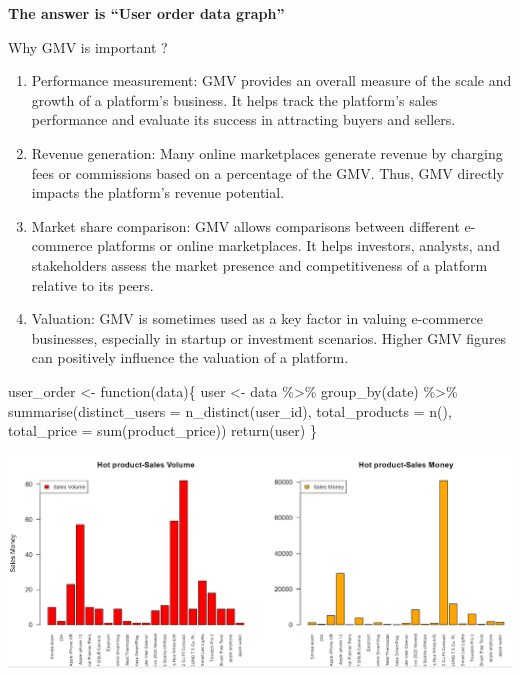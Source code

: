 \documentclass[
  11pt,
]{article}
\newenvironment{Shaded}{\begin{snugshade}}{\end{snugshade}}
\newcommand{\AttributeTok}[1]{\textcolor[rgb]{0.40,0.45,0.13}{#1}}
\newcommand{\ControlFlowTok}[1]{\textcolor[rgb]{0.00,0.23,0.31}{#1}}
\newcommand{\FunctionTok}[1]{\textcolor[rgb]{0.28,0.35,0.67}{#1}}
\newcommand{\NormalTok}[1]{\textcolor[rgb]{0.00,0.23,0.31}{#1}}
\newcommand{\OtherTok}[1]{\textcolor[rgb]{0.00,0.23,0.31}{#1}}
\newcommand{\SpecialCharTok}[1]{\textcolor[rgb]{0.37,0.37,0.37}{#1}}
\begin{document}
\textbf{The answer is ``User order data graph''}

Why GMV is important ?

\begin{enumerate}
\def\labelenumi{\arabic{enumi}.}
\item
  Performance measurement: GMV provides an overall measure of the scale
  and growth of a platform's business. It helps track the platform's
  sales performance and evaluate its success in attracting buyers and
  sellers.
\item
  Revenue generation: Many online marketplaces generate revenue by
  charging fees or commissions based on a percentage of the GMV. Thus,
  GMV directly impacts the platform's revenue potential.
\item
  Market share comparison: GMV allows comparisons between different
  e-commerce platforms or online marketplaces. It helps investors,
  analysts, and stakeholders assess the market presence and
  competitiveness of a platform relative to its peers.
\item
  Valuation: GMV is sometimes used as a key factor in valuing e-commerce
  businesses, especially in startup or investment scenarios. Higher GMV
  figures can positively influence the valuation of a platform.
\end{enumerate}

\begin{Shaded}
\begin{Highlighting}[]
\NormalTok{user\_order }\OtherTok{\textless{}{-}} \ControlFlowTok{function}\NormalTok{(data)\{}
\NormalTok{  user }\OtherTok{\textless{}{-}}\NormalTok{  data }\SpecialCharTok{\%\textgreater{}\%}
    \FunctionTok{group\_by}\NormalTok{(date) }\SpecialCharTok{\%\textgreater{}\%}
    \FunctionTok{summarise}\NormalTok{(}\AttributeTok{distinct\_users =} \FunctionTok{n\_distinct}\NormalTok{(user\_id),}
              \AttributeTok{total\_products =} \FunctionTok{n}\NormalTok{(),}
              \AttributeTok{total\_price =} \FunctionTok{sum}\NormalTok{(product\_price))}
  \FunctionTok{return}\NormalTok{(user)}
\NormalTok{\}}
\end{Highlighting}
\end{Shaded}

\includegraphics{img/hot.png}
\end{document}
